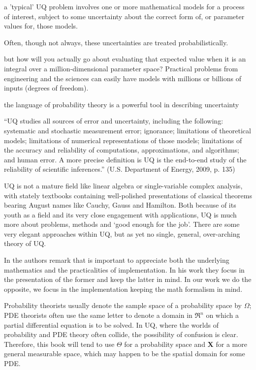a 'typical' UQ problem involves one or more mathematical models for a process of interest, subject to some uncertainty about the correct form of, or parameter values for, those models. \cite{Sullivan2015}

Often, though not always, these uncertainties are treated probabilistically. \cite{Sullivan2015}

but how will you actually go about evaluating that expected value when it is an integral over a million-dimensional parameter space?
Practical problems from engineering and the sciences can easily have models with millions or billions of inputs
(degrees of freedom). \cite{Sullivan2015}

the language of probability theory is a powerful tool in describing uncertainty \cite{Sullivan2015}

“UQ studies all sources of error and uncertainty, including the following: systematic and stochastic measurement error; ignorance; limitations of theoretical models; limitations of numerical representations of those models; limitations of the accuracy and reliability of computations, approximations, and algorithms; and human error. A more precise definition is UQ is the end-to-end study of the reliability of scientific inferences.” \cite{DEnergy2009} (U.S. Department of Energy, 2009, p. 135)

UQ is not a mature field like linear algebra or single-variable complex analysis, with stately textbooks containing well-polished presentations of classical theorems bearing August names like Cauchy, Gauss and Hamilton. Both because of its youth as a field and its very close engagement with applications, UQ is much more about problems, methods and ‘good enough for the job’. There are some very elegant approaches within UQ, but as yet no single, general, over-arching theory of UQ. \cite{Sullivan2015}

In \cite{Sullivan2015} the authors remark that is important to appreciate both the underlying mathematics and the practicalities of implementation. In his work they focus in the presentation of the former and keep the latter in mind. In our work we do the opposite, we focus in the implementation keeping the math formalism in mind.

Probability theorists usually denote the sample space of a probability space by $\Omega$; PDE theorists often use the same letter to denote a domain in $\Re^{n}$ on which a partial differential equation is to be solved. In UQ, where the worlds of probability and PDE theory often collide, the possibility of confusion is clear. Therefore, this book will tend to use $\Theta$ for a probability space and \textbf{X} for a more general measurable space, which may happen to be the spatial domain for some PDE.
